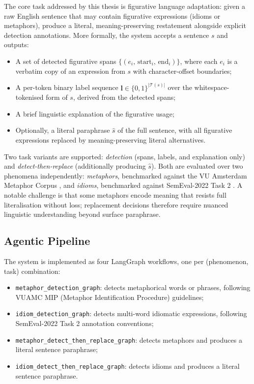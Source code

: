 The core task addressed by this thesis is figurative language adaptation: given a raw English sentence that may contain figurative expressions (idioms or metaphors), produce a literal, meaning-preserving restatement alongside explicit detection annotations.
More formally, the system accepts a sentence $s$ and outputs:
\begin{itemize}
    \item A set of detected figurative spans $\{(e_i,\, \text{start}_i,\, \text{end}_i)\}$, where each $e_i$ is a verbatim copy of an expression from $s$ with character-offset boundaries;
    \item A per-token binary label sequence $\mathbf{l} \in \{0,1\}^{|\mathcal{T}(s)|}$ over the whitespace-tokenised form of $s$, derived from the detected spans;
    \item A brief linguistic explanation of the figurative usage;
    \item Optionally, a literal paraphrase $\hat{s}$ of the full sentence, with all figurative expressions replaced by meaning-preserving literal alternatives.
\end{itemize}

Two task variants are supported: \textit{detection} (spans, labels, and explanation only) and \textit{detect-then-replace} (additionally producing $\hat{s}$). Both are evaluated over two phenomena independently: \textit{metaphors}, benchmarked against the VU Amsterdam Metaphor Corpus \cite{vuamsterdammetaphorcorpus}, and \textit{idioms}, benchmarked against SemEval-2022 Task 2 \cite{tayyar-madabushi-etal-2022-semeval}. A notable challenge is that some metaphors encode meaning that resists full literalisation without loss; replacement decisions therefore require nuanced linguistic understanding beyond surface paraphrase.

\subsection{Agentic Pipeline}

The system is implemented as four LangGraph workflows, one per (phenomenon, task) combination:
\begin{itemize}
    \item \texttt{metaphor\_detection\_graph}: detects metaphorical words or phrases, following VUAMC MIP (Metaphor Identification Procedure) guidelines;
    \item \texttt{idiom\_detection\_graph}: detects multi-word idiomatic expressions, following SemEval-2022 Task 2 annotation conventions;
    \item \texttt{metaphor\_detect\_then\_replace\_graph}: detects metaphors and produces a literal sentence paraphrase;
    \item \texttt{idiom\_detect\_then\_replace\_graph}: detects idioms and produces a literal sentence paraphrase.
\end{itemize}

